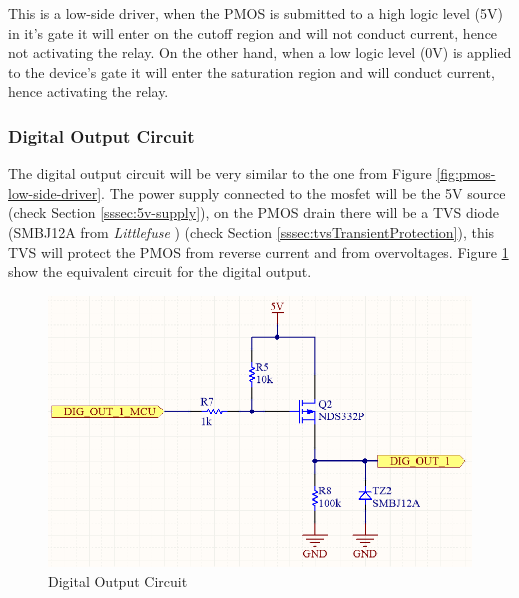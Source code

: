 			This is a low-side driver, when the PMOS is submitted to a high logic level (5V) in it's gate it will enter on the cutoff region and will not conduct current, hence not activating the relay. On the other hand, when a low logic level (0V) is applied to the device's gate it will enter the saturation region and will conduct current, hence activating the relay.

		\subsubsection{Digital Output Circuit}\label{sssec:digital-output-circuit}

			The digital output circuit will be very similar to the one from Figure \ref{fig:pmos-low-side-driver}. The power supply connected to the mosfet will be the 5V source (check Section \ref{sssec:5v-supply}), on the PMOS drain there will be a TVS diode (SMBJ12A from \textit{Littlefuse} \cite{smbj12a-datasheet}) (check Section \ref{sssec:tvsTransientProtection}), this TVS will protect the PMOS from reverse current and from overvoltages. Figure \ref{fig:digital-output-circuit} show the equivalent circuit for the digital output.

			\begin{figure}[htbp]
				\centering
				\includegraphics[scale=1.2]{figuras/fig-digital-output-circuit.png}
				\caption{Digital Output Circuit}
				\label{fig:digital-output-circuit}
			\end{figure}

